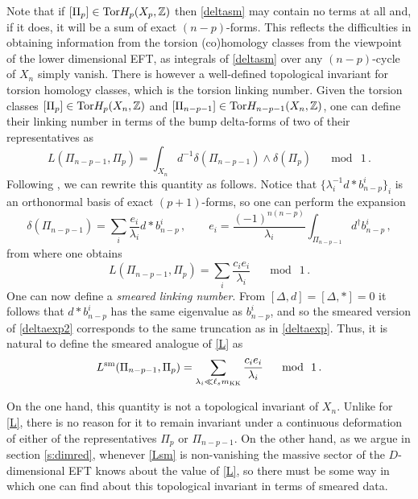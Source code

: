 \documentclass[11pt]{article}
\def\be{\begin{equation}}
\def\ee{\end{equation}}
\newcommand{\IZ}{\mathbb{Z}}
\begin{document}
Note that if $[\Pi_p] \in {\rm Tor} H_p (X_p, \IZ)$ then \eqref{deltasm} may contain no terms at all and, if it does, it will be a sum of exact $(n-p)$-forms. This reflects the difficulties in obtaining information from the torsion (co)homology classes from the viewpoint of the lower dimensional EFT, as integrals of \eqref{deltasm} over any $(n-p)$-cycle of $X_n$  simply vanish. There is however a well-defined topological invariant  for torsion homology classes, which is the torsion linking number. Given the torsion classes $[\Pi_p] \in {\rm Tor} H_p(X_n, \IZ)$ and $[\Pi_{n-p-1}] \in {\rm Tor} H_{n-p-1}(X_n, \IZ)$, one can define their linking number in terms of the bump delta-forms of two of their representatives as \cite{Camara:2011jg}  
\be
L( \Pi_{n-p-1},\Pi_p) = \int_{X_n}  d^{-1}  \delta(\Pi_{n-p-1}) \wedge \delta(\Pi_p)  \quad \mod \ 1 \, .
\ee
Following \cite{Horowitz:1989km}, we can rewrite this quantity as follows. Notice that $\{\lambda_i ^{-1}d*b^i_{n-p}\}_i$ is an orthonormal basis of exact $(p+1)$-forms, so one can perform the expansion 
\be
\delta(\Pi_{n-p-1}) = \sum_i \frac{e_i}{\lambda_i} d*b^i_{n-p} \, ,  \qquad e_i = \frac{(-1)^{n(n-p)}}{\lambda_i}\int_{\Pi_{n-p-1}}d^\dag  b^i_{n-p}\, ,
\label{deltaexp2}
\ee
from where one obtains
\be
L( \Pi_{n-p-1},\Pi_p) = \sum_i \frac{c_ie_i}{\lambda_i}   \quad \mod \ 1 \, .
\label{L}
\ee
One can now define a {\em smeared linking number}. From $[\Delta, d] = [\Delta, *] = 0$ it follows that $d* b_{n-p}^i$ has the same eigenvalue as $b_{n-p}^i$, and so the smeared version of \eqref{deltaexp2} corresponds to the same truncation as in \eqref{deltaexp}. Thus, it is natural to define the smeared analogue of \eqref{L} as
\be
L^{\rm sm}( \Pi_{n-p-1},\Pi_p) = \sum_{\lambda_i \ll \ell_s m_{\rm KK}} \frac{c_ie_i}{\lambda_i}   \quad \mod \ 1 \, .
\label{Lsm}
\ee

On the one hand, this quantity is not a topological invariant of $X_n$. Unlike for \eqref{L}, there is no reason for it to remain invariant under a continuous deformation of either of the representatives $\Pi_p$ or $ \Pi_{n-p-1}$. On the other hand, as we argue in section \ref{s:dimred}, whenever \eqref{Lsm} is non-vanishing the massive sector of the $D$-dimensional EFT  knows about the value of \eqref{L}, so there must be some way in which one can find about this topological invariant in terms of smeared data. 
\end{document}
